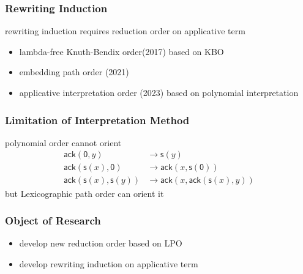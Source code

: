 \documentclass[12pt,aspectratio=169]{beamer}
\newcommand{\m}[1]{\mathsf{#1}}
\begin{document}
\begin{frame}
    \frametitle{Rewriting Induction}
    \begin{figure}
    \centering
    \end{figure}
    rewriting induction requires reduction order on applicative term
    \begin{itemize}
        \item lambda-free Knuth-Bendix order(2017) \quad based on KBO
        \item embedding path order (2021)
        \item applicative interpretation order (2023) \quad based on polynomial interpretation
    \end{itemize}
\end{frame}

\begin{frame}
    \frametitle{Limitation of Interpretation Method}
    \begin{example}
    polynomial order cannot orient
        \vspace{-1pt}
        \begin{align*}
            \m{ack}(\m{0}, y) &\to \m{s}(y)\\
            \m{ack}(\m{s}(x),\m{0}) &\to \m{ack}(x,\m{s}(\m{0}))\\
            \m{ack}(\m{s}(x),\m{s}(y)) &\to \m{ack}(x,\m{ack}(\m{s}(x),y))
        \end{align*}
    but Lexicographic path order can orient it
    \end{example}
\end{frame}

\begin{frame}
    \frametitle{Object of Research}
    \begin{itemize}
        \item develop new reduction order based on LPO
        \item develop rewriting induction on applicative term
    \end{itemize}
\end{frame}
\end{document}

